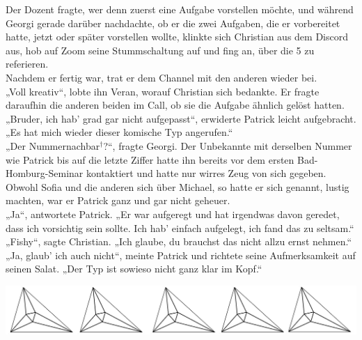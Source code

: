 \documentclass[oneside]{memoir}
\newcommand{\parasep}{
\bigskip
\bigskip
\begin{center} 
   \includegraphics[scale=.08]{parasep5.jpg} 
\end{center}
\bigskip
\bigskip
}
\begin{document}
Der Dozent fragte, wer denn zuerst eine Aufgabe vorstellen möchte, und während Georgi gerade darüber nachdachte, ob er die zwei Aufgaben, die er vorbereitet hatte, jetzt oder später vorstellen wollte, klinkte sich Christian aus dem Discord aus, hob auf Zoom seine Stummschaltung auf und fing an, über die 5 zu referieren.  \\
Nachdem er fertig war, trat er dem Channel mit den anderen wieder bei. \\
„Voll kreativ“, lobte ihn Veran, worauf Christian sich bedankte. Er fragte daraufhin die anderen beiden im Call, ob sie die Aufgabe ähnlich gelöst hatten. \\
„Bruder, ich hab' grad gar nicht aufgepasst“, erwiderte Patrick leicht aufgebracht. „Es hat mich wieder dieser komische Typ angerufen.“ \\
„Der Nummernachbar$^{\dagger}$?“, fragte Georgi. Der Unbekannte mit derselben Nummer wie Patrick bis auf die letzte Ziffer hatte ihn bereits vor dem ersten Bad-Homburg-Seminar kontaktiert und hatte nur wirres Zeug von sich gegeben. Obwohl Sofia und die anderen sich über Michael, so hatte er sich genannt, lustig machten, war er Patrick ganz und gar nicht geheuer. \\
„Ja“, antwortete Patrick. „Er war aufgeregt und hat irgendwas davon geredet, dass ich vorsichtig sein sollte. Ich hab' einfach aufgelegt, ich fand das zu seltsam.“ \\
„Fishy“, sagte Christian. „Ich glaube, du brauchst das nicht allzu ernst nehmen.“ \\
„Ja, glaub' ich auch nicht“, meinte Patrick und richtete seine Aufmerksamkeit auf seinen Salat. „Der Typ ist sowieso nicht ganz klar im Kopf.“

\parasep
\end{document}
